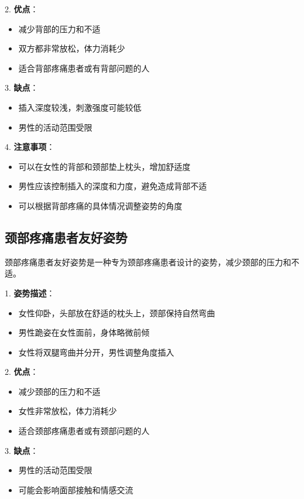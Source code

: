 \documentclass[12pt,UTF8]{ctexbook}
\begin{document}
2. \textbf{优点}：
  \begin{itemize}
  \item 减少背部的压力和不适
  \item 双方都非常放松，体力消耗少
  \item 适合背部疼痛患者或有背部问题的人
  \end{itemize}

3. \textbf{缺点}：
  \begin{itemize}
  \item 插入深度较浅，刺激强度可能较低
  \item 男性的活动范围受限
  \end{itemize}

4. \textbf{注意事项}：
  \begin{itemize}
  \item 可以在女性的背部和颈部垫上枕头，增加舒适度
  \item 男性应该控制插入的深度和力度，避免造成背部不适
  \item 可以根据背部疼痛的具体情况调整姿势的角度
  \end{itemize}

\subsection{颈部疼痛患者友好姿势}

颈部疼痛患者友好姿势是一种专为颈部疼痛患者设计的姿势，减少颈部的压力和不适。

1. \textbf{姿势描述}：
  \begin{itemize}
  \item 女性仰卧，头部放在舒适的枕头上，颈部保持自然弯曲
  \item 男性跪姿在女性面前，身体略微前倾
  \item 女性将双腿弯曲并分开，男性调整角度插入
  \end{itemize}

2. \textbf{优点}：
  \begin{itemize}
  \item 减少颈部的压力和不适
  \item 女性非常放松，体力消耗少
  \item 适合颈部疼痛患者或有颈部问题的人
  \end{itemize}

3. \textbf{缺点}：
  \begin{itemize}
  \item 男性的活动范围受限
  \item 可能会影响面部接触和情感交流
  \end{itemize}
\end{document}

